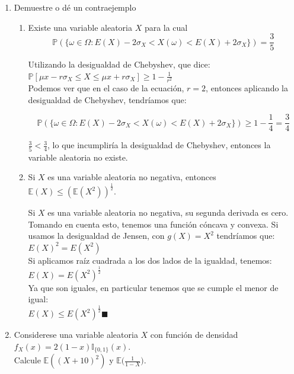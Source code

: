 \documentclass[12pt,a4paper]{report}
\begin{document}
\begin{enumerate}
		\item{
			Demuestre o dé un contraejemplo
			\begin{enumerate}
				\item {
					Existe una variable aleatoria $X$ para la cual
					\[\mathbb{P}(\{\omega \in \Omega : E(X) - 2\sigma_X <
					X(\omega) <
					E(X) + 2\sigma_X\}) = \frac{3}{5}\]
					
					
					Utilizando la desigualdad de Chebyshev, que dice:\\
					$\mathbb{P}[ \mu x - r\sigma_X \leq X \leq \mu x + r\sigma_X] \geq 1 - \frac{1}{r^2}$\\
					
				Podemos ver que en el caso de la ecuación, $r = 2$, entonces aplicando la desigualdad de Chebyshev, tendríamos que:
				
				\[\mathbb{P}(\{\omega \in \Omega : E(X) - 2\sigma_X <
					X(\omega) <
					E(X) + 2\sigma_X\}) \geq 1 - \frac{1}{4} = \frac{3}{4}\]
					
					$\frac{3}{5} < \frac{3}{4}$, lo que incumpliría la desigualdad de Chebyshev, entonces la variable aleatoria no existe.\\

				
				}

				\item {
					Si $X$ es una variable aleatoria no negativa, entonces
					$\mathbb{E}(X) \leq (\mathbb{E}(X^2))^{\frac{1}{2}}$.
					
					Si $X$ es una variable aleatoria no negativa, su segunda derivada es cero. Tomando en cuenta esto, tenemos una función cóncava y convexa. Si usamos la desigualdad de Jensen, con $g(X) = X^2$ tendríamos que:\\
					
					$E(X)^2 = E(X^2)$\\
					
					Si aplicamos raíz cuadrada a los dos lados de la igualdad, tenemos:\\
					$E(X) = E(X^2)^{\frac{1}{2}}$\\
					
					Ya que son iguales, en particular tenemos que se cumple el menor de igual:\\
					$E(X) \leq E(X^2)^{\frac{1}{2}}\blacksquare$
					
				}
			\end{enumerate}
		}

		\item{
			Considerese una variable aleatoria $X$ con función de densidad
			$f_X(x) = 2(1-x)\mathbb{I}_{\{0, 1\}}(x)$.\\
			Calcule $\mathbb{E}((X+10)^2)$ y
			$\mathbb{E}\Big(\frac{1}{1-X}\Big)$.
			
}
\end{enumerate}
\end{document}
